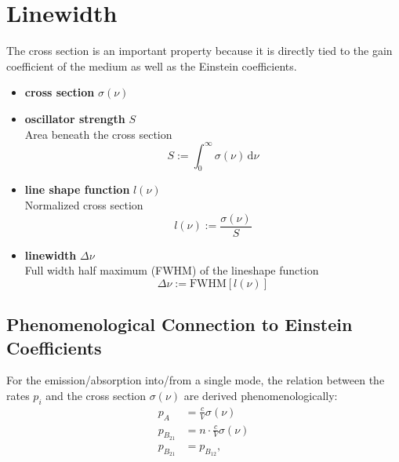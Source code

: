 \documentclass{article}
\newcommand{\diff}{\mathrm{d}}
\newcommand{\lreck}[1]{\left[#1\right]}
\begin{document}
%
%




\newpage


\section{Linewidth}
The cross section is an important property because it is directly tied to the gain coefficient of the medium as well as the Einstein coefficients.
	\begin{itemize}
		\item \textbf{cross section} $\sigma(\nu)$
		
		
		\item \textbf{oscillator strength} $S$\\
		Area beneath the cross section
			\begin{equation}
				S := \int_0^\infty \sigma(\nu) \, \diff \nu
			\end{equation}
		

		\item \textbf{line shape function} $l(\nu)$\\
		Normalized cross section
			\begin{equation}
				l(\nu) := \frac{\sigma(\nu)}{S}
			\end{equation}

		
		\item \textbf{linewidth} $\Delta\nu$\\
		Full width half maximum (FWHM) of the lineshape function
			\begin{equation}
				\Delta\nu := \text{FWHM} \lreck{ l(\nu) }
			\end{equation}
	\end{itemize}


\subsection{Phenomenological Connection to Einstein Coefficients}
For the emission/absorption into/from a single mode, the relation between the rates $p_i$ and the cross section $\sigma(\nu)$ are derived phenomenologically:
	\begin{align}
		p_A &= \frac{c}{V} \sigma(\nu) \\
		p_{B_{21}} &= n \cdot \frac{c}{V} \sigma(\nu) \\
		p_{B_{21}} &= p_{B_{12}},
	\end{align}
\end{document}
